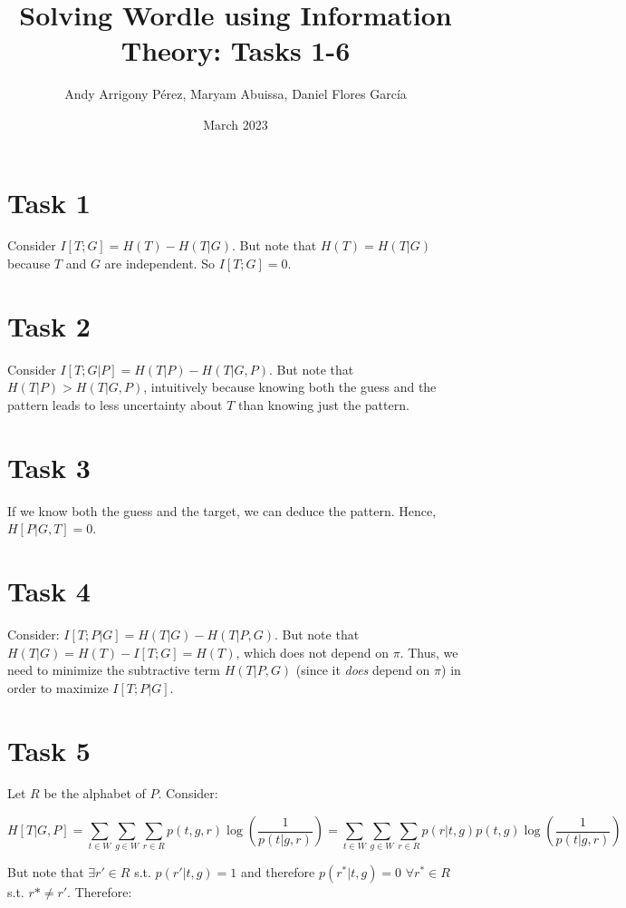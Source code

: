 \documentclass{article}
\title{Solving Wordle using Information Theory: Tasks 1-6}
\author{Andy Arrigony Pérez, Maryam Abuissa, Daniel Flores García}
\date{March 2023}
\begin{document}
\maketitle

\section{Task 1}

Consider $I[T; G] = H(T) - H(T|G)$. But note that $H(T) = H(T|G)$ because $T$ and $G$ are independent. So $I[T; G] = 0$.

\section{Task 2}

Consider $I[T;G|P] = H(T|P) - H(T|G,P)$. But note that $H(T|P) > H(T|G,P)$, intuitively because knowing both the guess and the pattern leads to less uncertainty about $T$ than knowing just the pattern.

\section{Task 3}

If we know both the guess and the target, we can deduce the pattern. Hence, $H[P | G, T] = 0$.

\section{Task 4}

Consider: $I[T; P|G] = H(T|G) - H(T|P,G)$. But note that $H(T|G) = H(T) - I[T;G] = H(T)$, which does not depend on $\pi$. Thus, we need to minimize the subtractive term $H(T|P,G)$ (since it \emph{does} depend on $\pi$) in order to maximize $I[T; P|G]$.

\section{Task 5}

Let $R$ be the alphabet of $P$. Consider:

\[
  H[T|G,P] = \sum_{t \in W} \sum_{g \in W} \sum_{r \in R} p(t, g, r)\log (\frac{1}{p(t|g,r)}) = \sum_{t \in W} \sum_{g \in W} \sum_{r \in R} p(r | t,g)p(t,g) \log(\frac{1}{p(t|g,r)})
\]

But note that $\exists r' \in R$ s.t. $p(r'  |t,g) = 1$ and therefore $p(r^* |t,g) = 0 \, \,\forall r^* \in R$ s.t. $r* \neq r'$. Therefore:
\end{document}
